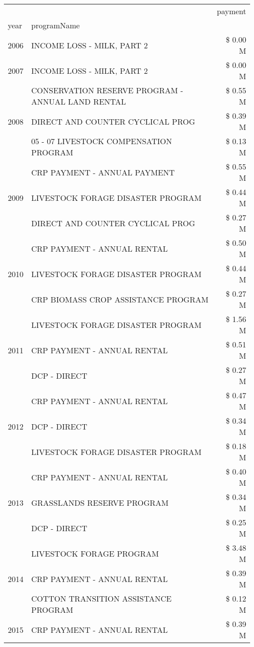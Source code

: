 \begin{tabular}{llr}
\toprule
 &  & payment \\
year & programName &  \\
\midrule
2006 & INCOME LOSS - MILK, PART 2 & \$ 0.00 M \\
\cline{1-3}
2007 & INCOME LOSS - MILK, PART 2 & \$ 0.00 M \\
\cline{1-3}
\multirow[t]{3}{*}{2008} & CONSERVATION RESERVE PROGRAM - ANNUAL LAND RENTAL & \$ 0.55 M \\
 & DIRECT AND COUNTER CYCLICAL PROG & \$ 0.39 M \\
 & 05 - 07 LIVESTOCK COMPENSATION PROGRAM & \$ 0.13 M \\
\cline{1-3}
\multirow[t]{3}{*}{2009} & CRP PAYMENT - ANNUAL PAYMENT & \$ 0.55 M \\
 & LIVESTOCK FORAGE DISASTER  PROGRAM & \$ 0.44 M \\
 & DIRECT AND COUNTER CYCLICAL PROG & \$ 0.27 M \\
\cline{1-3}
\multirow[t]{3}{*}{2010} & CRP PAYMENT - ANNUAL RENTAL & \$ 0.50 M \\
 & LIVESTOCK FORAGE DISASTER PROGRAM & \$ 0.44 M \\
 & CRP BIOMASS CROP ASSISTANCE PROGRAM & \$ 0.27 M \\
\cline{1-3}
\multirow[t]{3}{*}{2011} & LIVESTOCK FORAGE DISASTER PROGRAM & \$ 1.56 M \\
 & CRP PAYMENT - ANNUAL RENTAL & \$ 0.51 M \\
 & DCP - DIRECT & \$ 0.27 M \\
\cline{1-3}
\multirow[t]{3}{*}{2012} & CRP PAYMENT - ANNUAL RENTAL & \$ 0.47 M \\
 & DCP - DIRECT & \$ 0.34 M \\
 & LIVESTOCK FORAGE DISASTER PROGRAM & \$ 0.18 M \\
\cline{1-3}
\multirow[t]{3}{*}{2013} & CRP PAYMENT - ANNUAL RENTAL & \$ 0.40 M \\
 & GRASSLANDS RESERVE PROGRAM & \$ 0.34 M \\
 & DCP - DIRECT & \$ 0.25 M \\
\cline{1-3}
\multirow[t]{3}{*}{2014} & LIVESTOCK FORAGE PROGRAM & \$ 3.48 M \\
 & CRP PAYMENT - ANNUAL RENTAL & \$ 0.39 M \\
 & COTTON TRANSITION ASSISTANCE PROGRAM & \$ 0.12 M \\
\cline{1-3}
\multirow[t]{3}{*}{2015} & CRP PAYMENT - ANNUAL RENTAL & \$ 0.39 M \\

\end{tabular}
